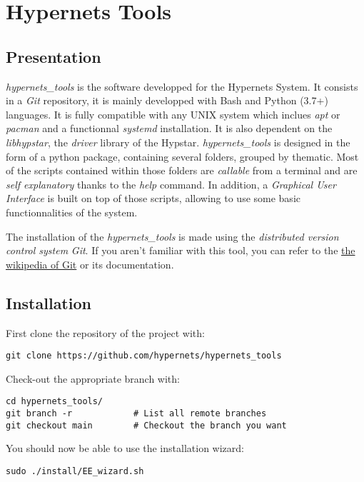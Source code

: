 
\section{Hypernets Tools}

\subsection{Presentation}
\par \textit{hypernets\_tools} is the software developped for the Hypernets System.
It consists in a \textit{Git} repository, it is mainly developped with Bash and
Python (3.7+) languages. It is fully compatible with any UNIX system which
inclues \textit{apt} or \textit{pacman} and a functionnal \textit{systemd}
installation. It is also dependent on the \textit{libhypstar}, the \textit{driver} 
library of the Hypstar.
\textit{hypernets\_tools} is designed in the form of a python package,
containing several folders, grouped by thematic.
Most of the scripts contained within those folders are \textit{callable} 
from a terminal and are \textit{self explanatory} thanks to the \textit{help} 
command. In addition, a \textit{Graphical User Interface} is built on top of those 
scripts, allowing to use some basic functionnalities of the system.
\par The installation of the \textit{hypernets\_tools} is made using the 
\textit{distributed version control system} \textit{Git}. 
If you aren't familiar with this tool, you can refer to the 
\href{https://en.wikipedia.org/wiki/Git}{the wikipedia of Git} or 
its documentation. 

\subsection{Installation}
First clone the repository of the project with:
\vspace{-10pt}
\begin{lstlisting}
git clone https://github.com/hypernets/hypernets_tools
\end{lstlisting}
Check-out the appropriate branch with:
\vspace{-10pt}
\begin{lstlisting}
cd hypernets_tools/
git branch -r            # List all remote branches
git checkout main        # Checkout the branch you want
\end{lstlisting}
You should now be able to use the installation wizard:
\vspace{-10pt}
\begin{lstlisting}
sudo ./install/EE_wizard.sh    
\end{lstlisting}

